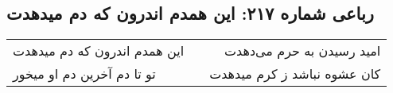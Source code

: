 \begin{center}
\section*{رباعی شماره ۲۱۷: این همدم اندرون که دم میدهدت}
\label{sec:0217}
\begin{longtable}{l p{0.5cm} r}
این همدم اندرون که دم میدهدت
&&
امید رسیدن به حرم می‌دهدت
\\
تو تا دم آخرین دم او میخور
&&
کان عشوه نباشد ز کرم میدهدت
\\
\end{longtable}
\end{center}
